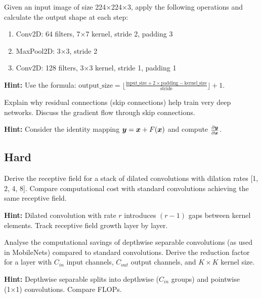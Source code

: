 \begin{problem}
Given an input image of size 224×224×3, apply the following operations and calculate the output shape at each step:
\begin{enumerate}
    \item Conv2D: 64 filters, 7×7 kernel, stride 2, padding 3
    \item MaxPool2D: 3×3, stride 2
    \item Conv2D: 128 filters, 3×3 kernel, stride 1, padding 1
\end{enumerate}

\textbf{Hint:} Use the formula: $\text{output\_size} = \lfloor \frac{\text{input\_size} + 2 \times \text{padding} - \text{kernel\_size}}{\text{stride}} \rfloor + 1$.
\end{problem}

\begin{problem}
Explain why residual connections (skip connections) help train very deep networks. Discuss the gradient flow through skip connections.

\textbf{Hint:} Consider the identity mapping $\boldsymbol{y} = \boldsymbol{x} + F(\boldsymbol{x})$ and compute $\frac{\partial \boldsymbol{y}}{\partial \boldsymbol{x}}$.
\end{problem}

\subsection*{Hard}

\begin{problem}
Derive the receptive field for a stack of dilated convolutions with dilation rates [1, 2, 4, 8]. Compare computational cost with standard convolutions achieving the same receptive field.

\textbf{Hint:} Dilated convolution with rate $r$ introduces $(r-1)$ gaps between kernel elements. Track receptive field growth layer by layer.
\end{problem}

\begin{problem}
Analyse the computational savings of depthwise separable convolutions (as used in MobileNets) compared to standard convolutions. Derive the reduction factor for a layer with $C_{in}$ input channels, $C_{out}$ output channels, and $K×K$ kernel size.

\textbf{Hint:} Depthwise separable splits into depthwise ($C_{in}$ groups) and pointwise (1×1) convolutions. Compare FLOPs.
\end{problem}


